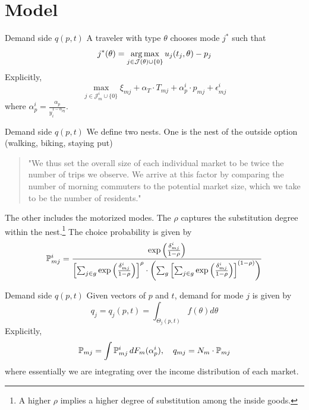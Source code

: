 \documentclass[10pt, aspectratio=169]{beamer}
\begin{document}
\section{Model}
\begin{frame}{Demand side $q(p,t)$}
  A traveler with type $\theta$ chooses mode $j^*$ such that
  \begin{equation*}
    j^*(\theta) = \operatorname*{arg\,max}_{j \in \mathcal{J}(\theta) \cup \{0\}} u_j(t_j, \theta) - p_j
  \end{equation*}
  Explicitly,
  \begin{equation*}
    \max_{j \in \mathcal{J}_m^i \cup \{0\}} \xi_{mj} + \alpha_T \cdot T_{mj} + \alpha_p^i \cdot p_{mj} + \epsilon_{mj}^i
  \end{equation*}
  where $\alpha_p^i = \frac{\alpha_p}{y_i^{1 - \alpha_{py}}}$.
\end{frame}
\begin{frame}{Demand side $q(p,t)$}
  We define two nests. One is the nest of the outside option (walking, biking, staying put)
  \begin{quotation}
    "We thus set the overall size of each individual market to be twice the number of trips we observe. We arrive at this factor by comparing the number of morning
    commuters to the potential market size, which we take to be the number of residents."
  \end{quotation}
  The other includes the motorized modes. The $\rho$ captures the substitution degree within the nest.\footnote{A higher $\rho$ implies a higher degree of substitution among the inside goods.}
  The choice probability is given by
  \begin{equation*}
    \mathbb{P}_{mj}^i = \frac{\exp\left( \frac{\delta_{mj}^i}{1-\rho} \right)}{
      \left[ \sum_{j \in g} \exp\left( \frac{\delta_{mj}^i}{1-\rho} \right) \right]^\rho \cdot \left( \sum_g \left[ \sum_{j \in g} \exp\left( \frac{\delta_{mj}^i}{1-\rho} \right) \right]^{(1-\rho)} \right)}
  \end{equation*}
\end{frame}

\begin{frame}{Demand side $q(p,t)$}
  Given vectors of $p$ and $t$, demand for mode $j$ is given by
  \begin{equation*}
    q_j = q_j({p}, {t}) = \int_{\Theta_j({p}, {t})} f(\theta) d\theta
  \end{equation*}
  Explicitly,
  \begin{equation*}
    \mathbb{P}_{mj} = \int \mathbb{P}_{mj}^i \, dF_m(\alpha_p^i),
    \quad q_{mj} = N_m \cdot \mathbb{P}_{mj}
  \end{equation*}
  where essentially we are integrating over the income distribution of each market.
\end{frame}
\end{document}
